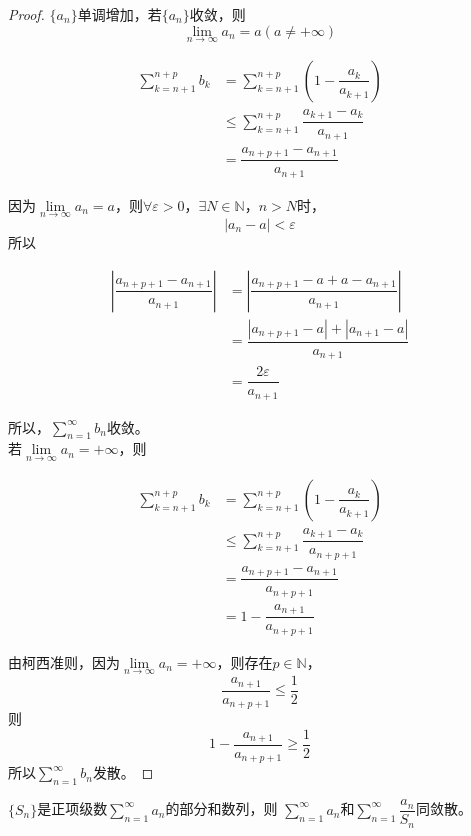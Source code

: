 \begin{proof}

    $\{a_n\}$单调增加，若$\{a_n\}$收敛，则
    $$\lim\limits_{n\to\infty}{a_n}=a(a\neq+\infty)$$

    \begin{align*}
        \sum\limits_{k=n+1}^{n+p}{b_k} &= \sum\limits_{k=n+1}^{n+p}{(1-\dfrac{a_k}{a_{k+1}})}\\
        & \leq \sum\limits_{k=n+1}^{n+p}{\dfrac{a_{k+1}-a_k}{a_{n+1}}}\\
        & = \dfrac{a_{n+p+1}-a_{n+1}}{a_{n+1}}
    \end{align*}

    因为$\lim\limits_{n\to\infty}{a_n}=a$，则$\forall \varepsilon >0$，$\exists N\in \mathbb{N}$，$n>N$时，
    $$|a_n-a|<\varepsilon$$
    所以

    \begin{align*}
        \left| \dfrac{a_{n+p+1}-a_{n+1}}{a_{n+1}}\right| &= \left| \dfrac{a_{n+p+1}-a + a -a_{n+1}}{a_{n+1}}\right|\\
        & = \dfrac{|a_{n+p+1}-a|+|a_{n+1}-a|}{a_{n+1}}\\
        & = \dfrac{2\varepsilon}{a_{n+1}}
    \end{align*} 

    所以，$\sum\limits_{n=1}^{\infty}{b_n}$收敛。\\
    若$\lim\limits_{n\to\infty}{a_n}=+\infty$，则

    \begin{align*}
        \sum\limits_{k=n+1}^{n+p}{b_k} &= \sum\limits_{k=n+1}^{n+p}{(1-\dfrac{a_k}{a_{k+1}})}\\
        & \leq \sum\limits_{k=n+1}^{n+p}{\dfrac{a_{k+1}-a_k}{a_{n+p+1}}}\\
        & = \dfrac{a_{n+p+1}-a_{n+1}}{a_{n+p+1}}\\
        & = 1-\dfrac{a_{n+1}}{a_{n+p+1}}
    \end{align*}

    由柯西准则，因为$\lim\limits_{n\to\infty}{a_n}=+\infty$，则存在$p \in \mathbb{N}$，
    $$ \dfrac{a_{n+1}}{a_{n+p+1}} \leq \dfrac{1}{2}$$
    则
    $$ 1-\dfrac{a_{n+1}}{a_{n+p+1}} \geq \dfrac{1}{2}$$
    所以$\sum\limits_{n=1}^{\infty}{b_n}$发散。

\end{proof}

\begin{theorem}
    
    $\{S_n\}$是正项级数$\sum\limits_{n=1}^{\infty}{a_n}$的部分和数列，则
    $\sum\limits_{n=1}^{\infty}{a_n}$和$\sum\limits_{n=1}^{\infty}{\dfrac{a_n}{S_n}}$同敛散。

\end{theorem}

